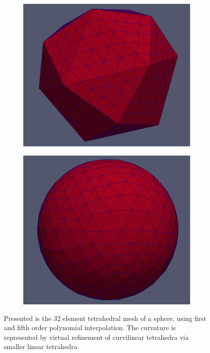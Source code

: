 \begin{figure}
    \centering
	\begin{subfigure}[b]{0.48\textwidth} \hspace{8mm} \includegraphics[scale=0.215]{images/sphere32discr6ord1} \end{subfigure}
	\begin{subfigure}[b]{0.48\textwidth} \includegraphics[scale=0.2]{images/sphere32discr6ord5} \end{subfigure}
	\captionsetup{width=0.8\textwidth} 
	\caption{Presented is the 32 element tetrahedral mesh of a sphere, using first and fifth order polynomial interpolation. The curvature is represented by virtual refinement of curvilinear tetrahedra via smaller linear tetrahedra. %
	}
	\label{fig:result:spherecurv}
\end{figure}

